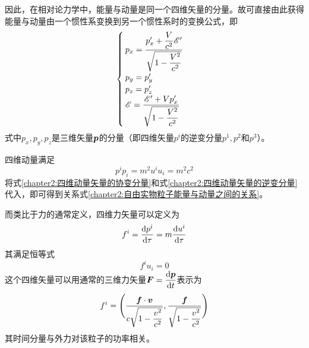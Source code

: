因此，在相对论力学中，能量与动量是同一个四维矢量的分量。故可直接由此获得能量与动量由一个惯性系变换到另一个惯性系时的变换公式，即
\begin{equation}
\begin{cases}
	\displaystyle p_x = \frac{p'_x+\dfrac{V}{c^2}\mathscr{E}'}{\sqrt{1-\dfrac{V^2}{c^2}}} \\
	p_y = p'_y \\
	p_z = p'_z \\
	\displaystyle \mathscr{E} = \frac{\mathscr{E}'+Vp'_x}{\sqrt{1-\dfrac{V^2}{c^2}}}
\end{cases}
\label{chapter2:惯性系能量动量变换关系式}
\end{equation}
式中$p_x, p_y, p_z$是三维矢量$\boldsymbol{p}$的分量（即四维矢量$p^i$的逆变分量$p^1, p^2$和$p^3$）。

四维动量满足
\begin{equation}
	p^ip_i = m^2u^iu_i = m^2c^2
	\label{chapter2:四维动量的平方}
\end{equation}
将式\eqref{chapter2:四维动量矢量的协变分量}和式\eqref{chapter2:四维动量矢量的逆变分量}代入，即可得到关系式\eqref{chapter2:自由实物粒子能量与动量之间的关系}。

而类比于力的通常定义，四维力矢量可以定义为
\begin{equation}
	f^i = \frac{\mathrm{d} p^i}{\mathrm{d} \tau} = m\frac{\mathrm{d} u^i}{\mathrm{d} \tau}
	\label{chapter2:四维力矢量}
\end{equation}
其满足恒等式
\begin{equation}
	f^i u_i = 0
\end{equation}
这个四维矢量可以用通常的三维力矢量$\boldsymbol{F} = \dfrac{\mathrm{d} \boldsymbol{p}}{\mathrm{d} t}$表示为
\begin{equation}
	f^i = \Bigg(\frac{\boldsymbol{f}\cdot\boldsymbol{v}}{c\sqrt{1-\dfrac{v^2}{c^2}}}, \frac{\boldsymbol{f}}{\sqrt{1-\dfrac{v^2}{c^2}}}\Bigg)
\end{equation}
其时间分量与外力对该粒子的功率相关。

